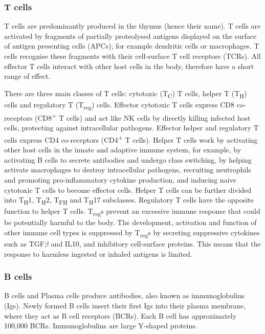 \subsubsection{T cells}
T cells are predominantly produced in the thymus (hence their name).
T cells are activated by fragments of partially proteolysed antigens displayed on the surface of antigen presenting cells (APCs), for example dendritic cells or macrophages.
T cells recognise these fragments with their cell-surface T cell receptors (TCRs)\@.
All effector T cells interact with other host cells in the body, therefore have a short range of effect.

There are three main classes of T cells: cytotoxic (T\textsubscript{C}) T cells, helper T (T\textsubscript{H}) cells and regulatory T (T\textsubscript{reg}) cells.
Effector cytotoxic T cells express CD8 co-receptors (CD8\textsuperscript{+} T cells) and act like NK cells by directly killing infected host cells, protecting against intracellular pathogens.
Effector helper and regulatory T cells express CD4 co-receptors (CD4\textsuperscript{+} T cells).
Helper T cells work by activating other host cells in the innate and adaptive immune system, for example, by activating B cells to secrete antibodies and undergo class switching, by helping activate macrophages to destroy intracellular pathogens, recruiting neutrophils and promoting pro-inflammatory cytokine production, and inducing naive cytotoxic T cells to become effector cells.
Helper T cells can be further divided into T\textsubscript{H}1, T\textsubscript{H}2, T\textsubscript{FH} and T\textsubscript{H}17 subclasses.
Regulatory T cells have the opposite function to helper T cells.
T\textsubscript{reg}s prevent an excessive immune response that could be potentially harmful to the body.
The development, activation and function of other immune cell types is suppressed by T\textsubscript{reg}s by secreting suppressive cytokines such as TGF$\beta$ and IL10, and inhibitory cell-surface proteins.
This means that the response to harmless ingested or inhaled antigens is limited.

%
\subsubsection{B cells}
B cells and Plasma cells produce antibodies, also known as immunoglobulins (Igs).
Newly formed B cells insert their first Igs into their plasma membrane, where they act as B cell receptors (BCRs).
Each B cell has approximately 100,000 BCRs.
Immunoglobulins are large Y-shaped proteins. 


